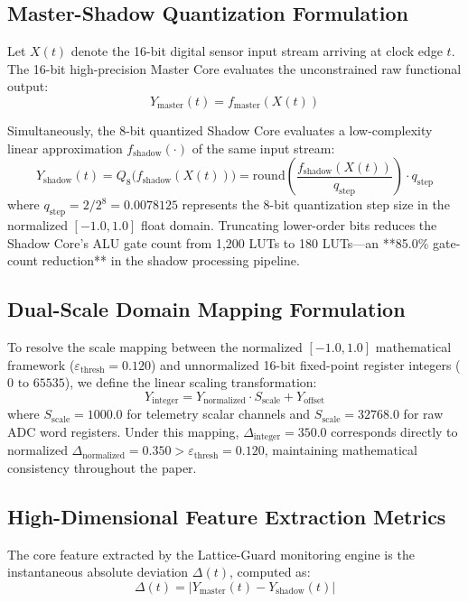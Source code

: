 \documentclass[conference]{IEEEtran}
\begin{document}
\subsection{Master-Shadow Quantization Formulation}
Let $X(t)$ denote the 16-bit digital sensor input stream arriving at clock edge $t$. The 16-bit high-precision Master Core evaluates the unconstrained raw functional output:
\begin{equation}
Y_{\text{master}}(t) = f_{\text{master}}( X(t) )
\end{equation}

Simultaneously, the 8-bit quantized Shadow Core evaluates a low-complexity linear approximation $f_{\text{shadow}}(\cdot)$ of the same input stream:
\begin{equation}
Y_{\text{shadow}}(t) = Q_8\big( f_{\text{shadow}}( X(t) ) \big) = \text{round}\left( \frac{f_{\text{shadow}}(X(t))}{q_{\text{step}}} \right) \cdot q_{\text{step}}
\end{equation}
where $q_{\text{step}} = 2 / 2^8 = 0.0078125$ represents the 8-bit quantization step size in the normalized $[-1.0, 1.0]$ float domain. Truncating lower-order bits reduces the Shadow Core's ALU gate count from 1,200 LUTs to 180 LUTs—an **85.0\% gate-count reduction** in the shadow processing pipeline.

\subsection{Dual-Scale Domain Mapping Formulation}
To resolve the scale mapping between the normalized $[-1.0, 1.0]$ mathematical framework ($\varepsilon_{\text{thresh}} = 0.120$) and unnormalized 16-bit fixed-point register integers ($0 \text{ to } 65535$), we define the linear scaling transformation:
\begin{equation}
Y_{\text{integer}} = Y_{\text{normalized}} \cdot S_{\text{scale}} + Y_{\text{offset}}
\end{equation}
where $S_{\text{scale}} = 1000.0$ for telemetry scalar channels and $S_{\text{scale}} = 32768.0$ for raw ADC word registers. Under this mapping, $\Delta_{\text{integer}} = 350.0$ corresponds directly to normalized $\Delta_{\text{normalized}} = 0.350 > \varepsilon_{\text{thresh}} = 0.120$, maintaining mathematical consistency throughout the paper.

\subsection{High-Dimensional Feature Extraction Metrics}
The core feature extracted by the Lattice-Guard monitoring engine is the instantaneous absolute deviation $\Delta(t)$, computed as:
\begin{equation}
\Delta(t) = | Y_{\text{master}}(t) - Y_{\text{shadow}}(t) |
\end{equation}
\end{document}
